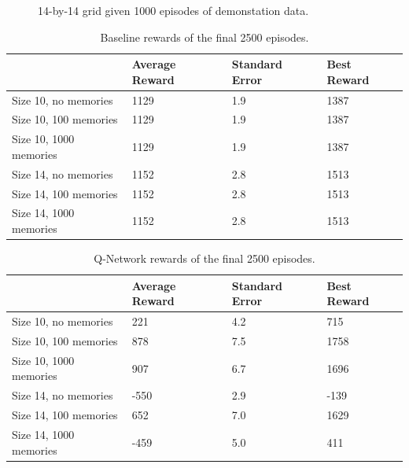 \begin{figure}[H]
    \caption{14-by-14 grid given 1000 episodes of demonstation data.}
    \label{fig:old-14sized-1000mem}
\end{figure}


\begin{table}[H]
\begin{tabular}{l|l|l|l|}
\cline{2-4}
\textbf{} & Average Reward & Standard Error & Best Reward \\ \hline
\multicolumn{1}{|l|}{Size 10, no memories} & 1129 & 1.9 & 1387 \\ \hline
\multicolumn{1}{|l|}{Size 10, 100 memories} & 1129 & 1.9 & 1387 \\ \hline
\multicolumn{1}{|l|}{Size 10, 1000 memories} & 1129 & 1.9 & 1387 \\ \hline
\multicolumn{1}{|l|}{Size 14, no memories} & 1152 & 2.8 & 1513 \\ \hline
\multicolumn{1}{|l|}{Size 14, 100 memories} & 1152 & 2.8 & 1513 \\ \hline
\multicolumn{1}{|l|}{Size 14, 1000 memories} & 1152 & 2.8 & 1513 \\ \hline
\end{tabular}
\caption{Baseline rewards of the final 2500 episodes.}
\label{tab:old-2500base}
\end{table}
\begin{table}[H]
\begin{tabular}{l|l|l|l|}
\cline{2-4}
\textbf{} & Average Reward & Standard Error & Best Reward \\ \hline
\multicolumn{1}{|l|}{Size 10, no memories} & 221 & 4.2 & 715 \\ \hline
\multicolumn{1}{|l|}{Size 10, 100 memories} & 878 & 7.5 & 1758 \\ \hline
\multicolumn{1}{|l|}{Size 10, 1000 memories} & 907 & 6.7 & 1696 \\ \hline
\multicolumn{1}{|l|}{Size 14, no memories} & -550 & 2.9 & -139 \\ \hline
\multicolumn{1}{|l|}{Size 14, 100 memories} & 652 & 7.0 & 1629 \\ \hline
\multicolumn{1}{|l|}{Size 14, 1000 memories} & -459 & 5.0 & 411 \\ \hline
\end{tabular}
\caption{Q-Network rewards of the final 2500 episodes.}
\label{tab:old-2500qnet}
\end{table}
